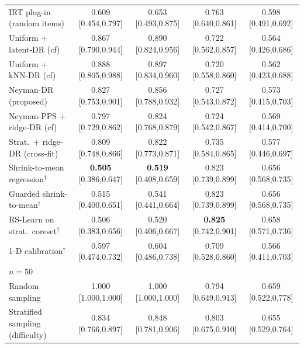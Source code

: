 \begin{tabular}{l cccc}
IRT plug-in (random items) & 0.609 {\scriptsize[0.454,0.797]} & 0.653 {\scriptsize[0.493,0.875]} & 0.763 {\scriptsize[0.640,0.861]} & 0.598 {\scriptsize[0.491,0.692]} \\
Uniform + latent-DR (cf) & 0.867 {\scriptsize[0.790,0.944]} & 0.890 {\scriptsize[0.824,0.956]} & 0.722 {\scriptsize[0.562,0.857]} & 0.564 {\scriptsize[0.426,0.686]} \\
Uniform + kNN-DR (cf) & 0.888 {\scriptsize[0.805,0.988]} & 0.897 {\scriptsize[0.834,0.960]} & 0.720 {\scriptsize[0.558,0.860]} & 0.562 {\scriptsize[0.423,0.688]} \\
Neyman-DR (proposed) & 0.827 {\scriptsize[0.753,0.901]} & 0.856 {\scriptsize[0.788,0.932]} & 0.727 {\scriptsize[0.543,0.872]} & 0.573 {\scriptsize[0.415,0.703]} \\
Neyman-PPS + ridge-DR (cf) & 0.797 {\scriptsize[0.729,0.862]} & 0.824 {\scriptsize[0.768,0.879]} & 0.724 {\scriptsize[0.542,0.867]} & 0.569 {\scriptsize[0.414,0.700]} \\
Strat.\ + ridge-DR (cross-fit) & 0.809 {\scriptsize[0.748,0.866]} & 0.822 {\scriptsize[0.773,0.871]} & 0.735 {\scriptsize[0.584,0.865]} & 0.577 {\scriptsize[0.446,0.697]} \\
Shrink-to-mean regression$^\dagger$ & \textbf{0.505} {\scriptsize[0.386,0.647]} & \textbf{0.519} {\scriptsize[0.408,0.659]} & 0.823 {\scriptsize[0.739,0.899]} & 0.656 {\scriptsize[0.568,0.735]} \\
Guarded shrink-to-mean$^\dagger$ & 0.515 {\scriptsize[0.400,0.651]} & 0.541 {\scriptsize[0.441,0.664]} & 0.823 {\scriptsize[0.739,0.899]} & 0.656 {\scriptsize[0.568,0.735]} \\
RS-Learn on strat.\ coreset$^\dagger$ & 0.506 {\scriptsize[0.383,0.656]} & 0.520 {\scriptsize[0.406,0.667]} & \textbf{0.825} {\scriptsize[0.742,0.901]} & 0.658 {\scriptsize[0.571,0.736]} \\
1-D calibration$^\dagger$ & 0.597 {\scriptsize[0.474,0.732]} & 0.604 {\scriptsize[0.486,0.738]} & 0.709 {\scriptsize[0.528,0.860]} & 0.566 {\scriptsize[0.411,0.703]} \\
\midrule
\multicolumn{5}{l}{\emph{$n=50$}}\\
Random sampling & 1.000 {\scriptsize[1.000,1.000]} & 1.000 {\scriptsize[1.000,1.000]} & 0.794 {\scriptsize[0.649,0.913]} & 0.659 {\scriptsize[0.522,0.778]} \\
Stratified sampling (difficulty) & 0.834 {\scriptsize[0.766,0.897]} & 0.848 {\scriptsize[0.781,0.906]} & 0.803 {\scriptsize[0.675,0.910]} & 0.655 {\scriptsize[0.529,0.764]} \\

\end{tabular}
